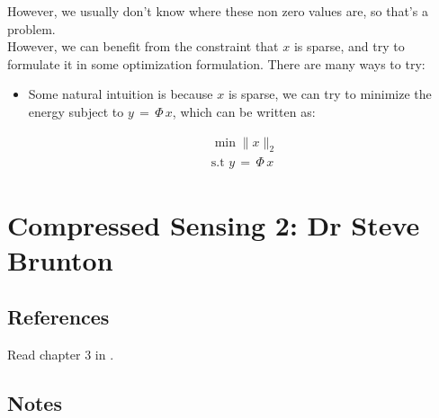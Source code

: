 \documentclass[12pt,a4paper]{book}
\begin{document}
However, we usually don't know where these non zero values are, so that's a problem.\\

However, we can benefit from the constraint that $x$ is sparse, and try to formulate it in some optimization formulation. There are many ways to try:

\begin{itemize}

\item Some natural intuition is because $x$ is sparse, we can try to minimize the energy subject to $y \, = \, \Phi \, x$, which can be written as: 


\begin{equation}
\begin{array}{rcl}
\min \parallel x \parallel_2 \\
\text{s.t } y \, = \, \Phi \, x
\end{array}
\end{equation}

\end{itemize}



\chapter{Compressed Sensing 2: Dr Steve Brunton}

\section{References}

Read chapter 3 in \cite{data_driven_approach}.

\section{Notes}
\end{document}
